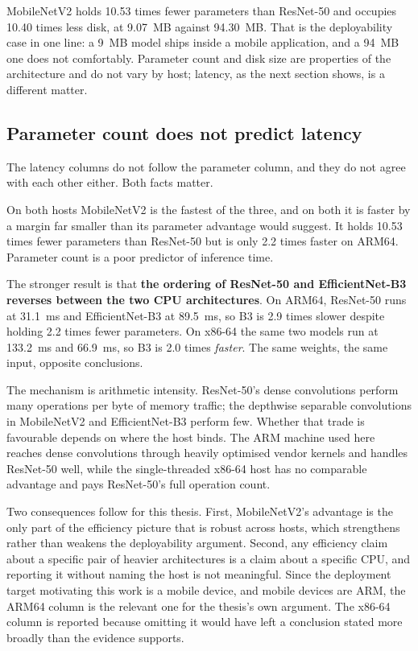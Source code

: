 MobileNetV2 holds 10.53 times fewer parameters than ResNet-50 and occupies 10.40 times
less disk, at 9.07~MB against 94.30~MB. That is the deployability case in one line: a
9~MB model ships inside a mobile application, and a 94~MB one does not comfortably.
Parameter count and disk size are properties of the architecture and do not vary by host;
latency, as the next section shows, is a different matter.

\subsection{Parameter count does not predict latency}
\label{sec:results-latency-surprise}

The latency columns do not follow the parameter column, and they do not agree with each
other either. Both facts matter.

On both hosts MobileNetV2 is the fastest of the three, and on both it is faster by a
margin far smaller than its parameter advantage would suggest. It holds 10.53 times fewer
parameters than ResNet-50 but is only 2.2 times faster on ARM64. Parameter count is a
poor predictor of inference time.

The stronger result is that \textbf{the ordering of ResNet-50 and EfficientNet-B3
reverses between the two CPU architectures}. On ARM64, ResNet-50 runs at 31.1~ms and
EfficientNet-B3 at 89.5~ms, so B3 is 2.9 times slower despite holding 2.2 times fewer
parameters. On x86-64 the same two models run at 133.2~ms and 66.9~ms, so B3 is 2.0 times
\emph{faster}. The same weights, the same input, opposite conclusions.

The mechanism is arithmetic intensity. ResNet-50's dense convolutions perform many
operations per byte of memory traffic; the depthwise separable convolutions in
MobileNetV2 and EfficientNet-B3 perform few. Whether that trade is favourable depends on
where the host binds. The ARM machine used here reaches dense convolutions through
heavily optimised vendor kernels and handles ResNet-50 well, while the single-threaded
x86-64 host has no comparable advantage and pays ResNet-50's full operation count.

Two consequences follow for this thesis. First, MobileNetV2's advantage is the only part
of the efficiency picture that is robust across hosts, which strengthens rather than
weakens the deployability argument. Second, any efficiency claim about a specific pair of
heavier architectures is a claim about a specific CPU, and reporting it without naming
the host is not meaningful. Since the deployment target motivating this work is a mobile
device, and mobile devices are ARM, the ARM64 column is the relevant one for the thesis's
own argument. The x86-64 column is reported because omitting it would have left a
conclusion stated more broadly than the evidence supports.

